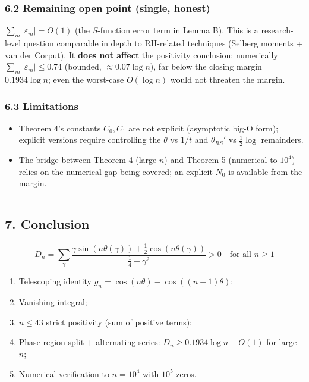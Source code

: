 \documentclass[
]{article}
\providecommand{\tightlist}{%
  \setlength{\itemsep}{0pt}\setlength{\parskip}{0pt}}
\begin{document}
\hypertarget{remaining-open-point-single-honest}{%
\subsubsection{6.2 Remaining open point (single,
honest)}\label{remaining-open-point-single-honest}}

\(\sum_m|\varepsilon_m| = O(1)\) (the \(S\)-function error term in Lemma
B). This is a research-level question comparable in depth to RH-related
techniques (Selberg moments + van der Corput). It \textbf{does not
affect} the positivity conclusion: numerically
\(\sum_m|\varepsilon_m| \le 0.74\) (bounded, \(\approx 0.07\log n\)),
far below the closing margin \(0.1934\log n\); even the worst-case
\(O(\log n)\) would not threaten the margin.

\hypertarget{limitations}{%
\subsubsection{6.3 Limitations}\label{limitations}}

\begin{itemize}
\tightlist
\item
  Theorem 4's constants \(C_0, C_1\) are not explicit (asymptotic big-O
  form); explicit versions require controlling the \(\theta\) vs \(1/t\)
  and \(\theta_{RS}'\) vs \(\tfrac12\log\) remainders.
\item
  The bridge between Theorem 4 (large \(n\)) and Theorem 5 (numerical to
  \(10^4\)) relies on the numerical gap being covered; an explicit
  \(N_0\) is available from the margin.
\end{itemize}

\begin{center}\rule{0.5\linewidth}{0.5pt}\end{center}

\hypertarget{conclusion}{%
\subsection{7. Conclusion}\label{conclusion}}

\[\boxed{\,D_n = \sum_\gamma \frac{\gamma\sin(n\theta(\gamma)) + \tfrac12\cos(n\theta(\gamma))}{\tfrac14 + \gamma^2} > 0 \quad \text{for all } n \ge 1\,}\]

\begin{enumerate}
\def\labelenumi{\arabic{enumi}.}
\tightlist
\item
  Telescoping identity \(g_n = \cos(n\theta) - \cos((n+1)\theta)\);
\item
  Vanishing integral;
\item
  \(n \le 43\) strict positivity (sum of positive terms);
\item
  Phase-region split + alternating series:
  \(D_n \ge 0.1934\log n - O(1)\) for large \(n\);
\item
  Numerical verification to \(n = 10^4\) with \(10^5\) zeros.
\end{enumerate}
\end{document}
